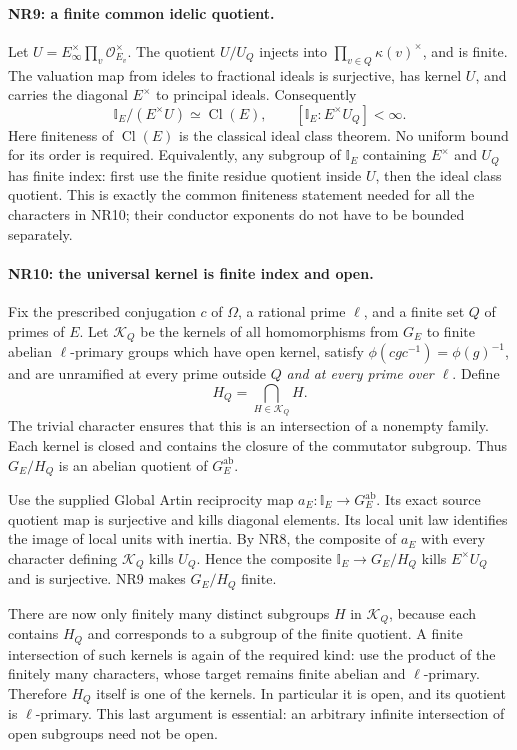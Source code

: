 \paragraph{NR9: a finite common idelic quotient.}
Let $U=E_\infty^\times\prod_v\mathcal O_{E_v}^\times$.
The quotient $U/U_Q$ injects into
$\prod_{v\in Q}\kappa(v)^\times$, and is finite. The valuation
map from ideles to fractional ideals is surjective, has kernel
$U$, and carries the diagonal $E^\times$ to principal ideals.
Consequently
\[
 \mathbb I_E/(E^\times U)\simeq\operatorname{Cl}(E),\qquad
                  [\mathbb I_E:E^\times U_Q]<\infty.  \tag{NR.17}
\]
Here finiteness of $\operatorname{Cl}(E)$ is the classical ideal
class theorem. No uniform bound for its order is required.
Equivalently, any subgroup of $\mathbb I_E$ containing $E^\times$
and $U_Q$ has finite index: first use the finite residue quotient
inside $U$, then the ideal class quotient. This is exactly the
common finiteness statement needed for all the characters in
NR10; their conductor exponents do not have to be bounded separately.

\paragraph{NR10: the universal kernel is finite index and open.}
Fix the prescribed conjugation $c$ of $\Omega$, a rational prime
$\ell$, and a finite set $Q$ of primes of $E$. Let $\mathcal K_Q$
be the kernels of all homomorphisms from $G_E$ to finite abelian
$\ell$-primary groups which have open kernel, satisfy
$\phi(cgc^{-1})=\phi(g)^{-1}$, and are unramified at every prime
outside $Q$ \emph{and at every prime over $\ell$}. Define
\[
                         H_Q=\bigcap_{H\in\mathcal K_Q}H.
                                                               \tag{NR.18}
\]
The trivial character ensures that this is an intersection of a
nonempty family. Each kernel is closed and contains the closure
of the commutator subgroup. Thus $G_E/H_Q$ is an abelian quotient
of $G_E^{\mathrm{ab}}$.

Use the supplied Global Artin reciprocity map
$a_E:\mathbb I_E\to G_E^{\mathrm{ab}}$. Its exact source quotient
map is surjective and kills diagonal elements. Its local unit
law identifies the image of local units with inertia. By NR8,
the composite of $a_E$ with every character defining
$\mathcal K_Q$ kills $U_Q$. Hence the composite
$\mathbb I_E\to G_E/H_Q$ kills $E^\times U_Q$ and is surjective.
NR9 makes $G_E/H_Q$ finite.

There are now only finitely many distinct subgroups $H$ in
$\mathcal K_Q$, because each contains $H_Q$ and corresponds to a
subgroup of the finite quotient. A finite intersection of such
kernels is again of the required kind: use the product of the
finitely many characters, whose target remains finite abelian
and $\ell$-primary. Therefore $H_Q$ itself is one of the kernels.
In particular it is open, and its quotient is $\ell$-primary.
This last argument is essential: an arbitrary infinite
intersection of open subgroups need not be open.

